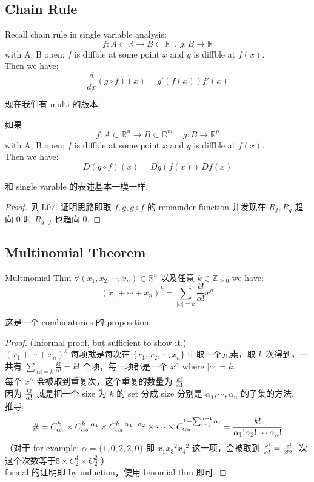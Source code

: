 \documentclass[lang=cn,11pt]{elegantbook}
\begin{document}
\subsection{Chain Rule}
\noindent Recall chain rule in single variable analysis:
$$f: A \subset \mathbb{R} \rightarrow B \subset \mathbb{R} \;\; \text{, } g: B \rightarrow \mathbb{R} 
$$
with A, B open; $f$ is diffble at some point $x$ and $g$ is diffble at $f(x)$.\\
Then we have: 
$$
\frac{d}{dx} (g \circ f) (x) = g'(f(x)) f'(x)
$$

现在我们有 multi 的版本:
\begin{theorem}
    如果 $$f: A \subset \mathbb{R}^n \rightarrow B \subset \mathbb{R}^m \;\; \text{, } g: B \rightarrow \mathbb{R}^p 
$$
with A, B open; $f$ is diffble at some point $x$ and $g$ is diffble at $f(x)$.\\
Then we have:
$$
D (g \circ f) (x) =Dg(f(x))\, Df(x)
$$
\end{theorem}
和 single varable 的表述基本一模一样.
\begin{proof}
    见 L07. 证明思路即取 $f,g, g\circ f$ 的 remainder function 并发现在 $R_f, R_g$ 趋向 0 时 $R_{g\circ f}$ 也趋向 0.
\end{proof}

\subsection{Multinomial Theorem}
\begin{theorem}{Multinomial Thm} \label{Multinomial Thm}
$\forall (x_1, x_2, \cdots, x_n) \in \mathbb{R}^n$ 以及任意 $k \in \mathbb{Z}_{\geq 0}$ we have:
$$
{(x_1 + \cdots + x_n)}^k  = \sum_{|\alpha| = k} \frac{k!}{\alpha !} x^\alpha 
$$
\end{theorem}
这是一个 combinatorics 的 proposition. 
\begin{proof}
    (Informal proof, but sufficient to show it.)\\
    ${(x_1 + \cdots + x_n)}^k$ 每项就是每次在 $\{x_1, x_2, \cdots, x_n\}$ 中取一个元素，取 $k$ 次得到，一共有 $\sum_{|\alpha| = k} \frac{k!}{\alpha !} = k!$ 个项，每一项都是一个 $x^\alpha$ where  $|\alpha| = k$.\\
    每个 $x^\alpha$ 会被取到重复次，这个重复的数量为 ${k! \over \alpha !}$\\
     因为 $k! \over \alpha !$ 就是把一个 size 为 $k$ 的 set 分成 size 分别是 $\alpha_1, \cdots, \alpha_n$ 的子集的方法.\\
     推导: 
$$
\# =  C^k_{\alpha_1} \times  C^{k-\alpha_1}_{\alpha_2}  \times C^{k-\alpha_1 - \alpha_2}_{\alpha_3} \times\cdots \times C^{k - \sum_{i=1}^{n-1} \alpha _i}_{\alpha_n} = {k! \over \alpha_1! \alpha_2 ! \cdots \alpha_n !}
$$
    （对于 for example:  $\alpha = \{1,0,2,2,0\}$ 即 $x_1 {x_3}^2 {x_4}^2$ 这一项，会被取到 ${k! \over \alpha !} = \frac{5!}{2!2!}$ 次. 这个次数等于$ 5 \times C^4_2 \times C^2_2 $ ）
    \\ formal 的证明即 by induction，使用 binomial thm 即可.
\end{proof}
\end{document}
